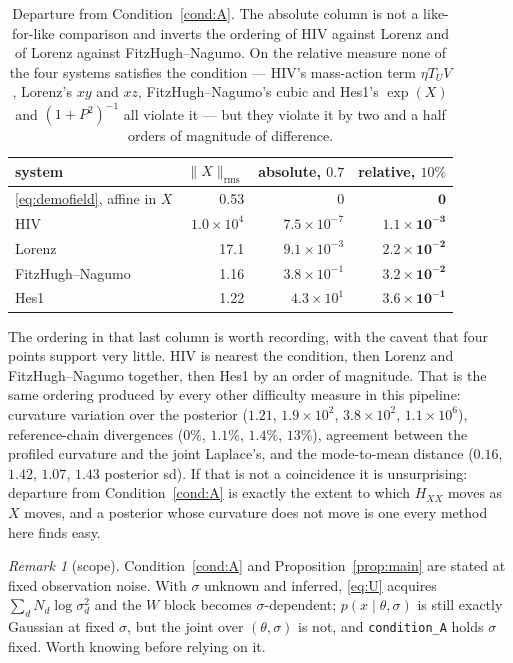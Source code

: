 \documentclass[11pt]{article}
\newcommand{\code}[1]{\texttt{\small #1}}
\newcommand{\Hxx}{H_{\!X\!X}}
\theoremstyle{plain}
\theoremstyle{definition}
\theoremstyle{remark}
\newtheorem{remark}{Remark}
\begin{document}
\begin{table}[h]
\centering\small
\begin{tabular}{lrrr}
\toprule
system & $\|X\|_{\mathrm{rms}}$ & absolute, $0.7$ & \textbf{relative, $10\%$}\\
\midrule
\eqref{eq:demofield}, affine in $X$ & 0.53 & $0$ & $\mathbf{0}$\\
HIV            & $1.0\times10^{4}$ & $7.5\times10^{-7}$ & $\mathbf{1.1\times10^{-3}}$\\
Lorenz         & 17.1 & $9.1\times10^{-3}$ & $\mathbf{2.2\times10^{-2}}$\\
FitzHugh--Nagumo & 1.16 & $3.8\times10^{-1}$ & $\mathbf{3.2\times10^{-2}}$\\
Hes1           & 1.22 & $4.3\times10^{1}$  & $\mathbf{3.6\times10^{-1}}$\\
\bottomrule
\end{tabular}
\caption{Departure from Condition~\ref{cond:A}. The absolute column is not a like-for-like
comparison and inverts the ordering of HIV against Lorenz and of Lorenz against
FitzHugh--Nagumo. On the relative measure none of the four systems satisfies the condition ---
HIV's mass-action term $\eta T_U V$, Lorenz's $xy$ and $xz$, FitzHugh--Nagumo's cubic and Hes1's
$\exp(X)$ and $(1+P^2)^{-1}$ all violate it --- but they violate it by two and a half orders of
magnitude of difference.}
\label{tab:near}
\end{table}

The ordering in that last column is worth recording, with the caveat that four points support very
little. HIV is nearest the condition, then Lorenz and FitzHugh--Nagumo together, then Hes1 by an
order of magnitude. That is the same ordering produced by every other difficulty measure in this
pipeline: curvature variation over the posterior ($1.21$, $1.9\times10^2$, $3.8\times10^2$,
$1.1\times10^6$), reference-chain divergences ($0\%$, $1.1\%$, $1.4\%$, $13\%$), agreement between
the profiled curvature and the joint Laplace's, and the mode-to-mean distance ($0.16$, $1.42$,
$1.07$, $1.43$ posterior sd). If that is not a coincidence it is unsurprising: departure from
Condition~\ref{cond:A} is exactly the extent to which $\Hxx$ moves as $X$ moves, and a posterior
whose curvature does not move is one every method here finds easy.

\begin{remark}[scope]
Condition~\ref{cond:A} and Proposition~\ref{prop:main} are stated at fixed observation noise. With
$\sigma$ unknown and inferred, \eqref{eq:U} acquires $\sum_d N_d \log \sigma_d^2$ and the $W$ block
becomes $\sigma$-dependent; $p(x \mid \theta, \sigma)$ is still exactly Gaussian at fixed $\sigma$,
but the joint over $(\theta,\sigma)$ is not, and \code{condition\_A} holds $\sigma$ fixed. Worth
knowing before relying on it.
\end{remark}
\end{document}
